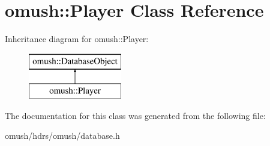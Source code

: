 \hypertarget{classomush_1_1_player}{\section{omush\-:\-:Player Class Reference}
\label{classomush_1_1_player}
}
Inheritance diagram for omush\-:\-:Player\-:\begin{figure}[H]
\begin{center}
\leavevmode
\includegraphics[height=2.000000cm]{classomush_1_1_player}
\end{center}
\end{figure}


The documentation for this class was generated from the following file\-:\begin{DoxyCompactItemize}
\item 
omush/hdrs/omush/database.\-h\end{DoxyCompactItemize}
